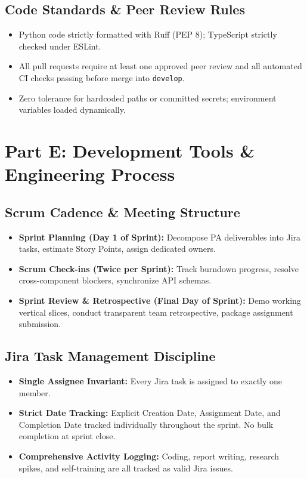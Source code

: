 \documentclass[11pt,a4paper]{article}
\begin{document}
\subsection{Code Standards \& Peer Review Rules}
\begin{itemize}[leftmargin=1.2cm]
    \item Python code strictly formatted with Ruff (PEP 8); TypeScript strictly checked under ESLint.
    \item All pull requests require at least one approved peer review and all automated CI checks passing before merge into \texttt{develop}.
    \item Zero tolerance for hardcoded paths or committed secrets; environment variables loaded dynamically.
\end{itemize}

\newpage

\section{Part E: Development Tools \& Engineering Process}
\subsection{Scrum Cadence \& Meeting Structure}
\begin{itemize}[leftmargin=1.2cm]
    \item \textbf{Sprint Planning (Day 1 of Sprint):} Decompose PA deliverables into Jira tasks, estimate Story Points, assign dedicated owners.
    \item \textbf{Scrum Check-ins (Twice per Sprint):} Track burndown progress, resolve cross-component blockers, synchronize API schemas.
    \item \textbf{Sprint Review \& Retrospective (Final Day of Sprint):} Demo working vertical slices, conduct transparent team retrospective, package assignment submission.
\end{itemize}

\subsection{Jira Task Management Discipline}
\begin{itemize}[leftmargin=1.2cm]
    \item \textbf{Single Assignee Invariant:} Every Jira task is assigned to exactly one member.
    \item \textbf{Strict Date Tracking:} Explicit Creation Date, Assignment Date, and Completion Date tracked individually throughout the sprint. No bulk completion at sprint close.
    \item \textbf{Comprehensive Activity Logging:} Coding, report writing, research spikes, and self-training are all tracked as valid Jira issues.
\end{itemize}
\end{document}

